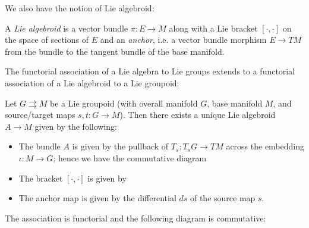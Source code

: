 We also have the notion of Lie algebroid:
\begin{defn}
A \emph{Lie algebroid} is a vector bundle $\pi: E \to M$ along with a Lie bracket $[\cdot,\cdot]$ on the space of sections of $E$ and an \emph{anchor}, i.e. a vector bundle morphism $E \to TM$ from the bundle to the tangent bundle of the base manifold. %
\end{defn}

The functorial association of a Lie algebra to Lie groups extends to a functorial association of a Lie algebroid to a Lie groupoid:

\begin{thrm} %
Let $G \rightrightarrows M$ be a Lie groupoid (with overall manifold $G$, base manifold $M$, and source/target maps $s,t: G \to M$). Then there exists a unique Lie algebroid $A \to M$ given by the following:
\begin{itemize}
\item The bundle $A$ is given by the pullback of $T_s : T_sG \to TM$ across the embedding $\iota: M \to G$; %
hence we have the commutative diagram

\item The bracket $[\cdot,\cdot]$ is given by %

\item The anchor map is given by the differential $ds$ of the source map $s$.

\end{itemize}

The association is functorial and the following diagram is commutative:

\end{thrm}

